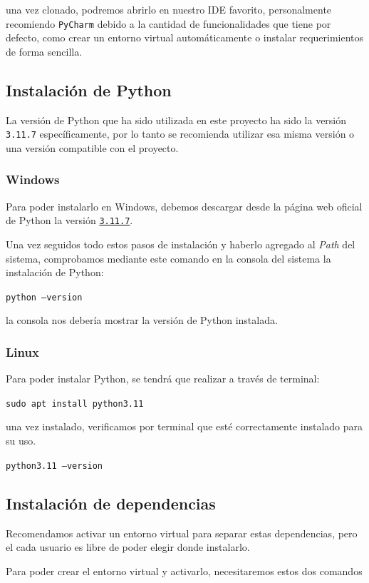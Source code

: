 una vez clonado, podremos abrirlo en nuestro IDE favorito, personalmente recomiendo \texttt{PyCharm} debido a la cantidad de funcionalidades que tiene por defecto, como crear un entorno virtual automáticamente o instalar requerimientos de forma sencilla.

\subsection{Instalación de Python}
La versión de Python que ha sido utilizada en este proyecto ha sido la versión \texttt{3.11.7} específicamente, por lo tanto se recomienda utilizar esa misma versión o una versión compatible con el proyecto.

\subsubsection{Windows}
Para poder instalarlo en Windows, debemos descargar desde la página web oficial de Python la versión \href{https://www.python.org/downloads/release/python-3117/}{\texttt{3.11.7}}.

Una vez seguidos todo estos pasos de instalación y haberlo agregado al \textit{Path} del sistema, comprobamos mediante este comando en la consola del sistema la instalación de Python:

\texttt{python --version}

la consola nos debería mostrar la versión de Python instalada.

\subsubsection{Linux}
Para poder instalar Python, se tendrá que realizar a través de terminal:

\texttt{sudo apt install python3.11}

una vez instalado, verificamos por terminal que esté correctamente instalado para su uso.

\texttt{python3.11 --version}

\subsection{Instalación de dependencias}
Recomendamos activar un entorno virtual para separar estas dependencias, pero el cada usuario es libre de poder elegir donde instalarlo.

Para poder crear el entorno virtual y activarlo, necesitaremos estos dos comandos


